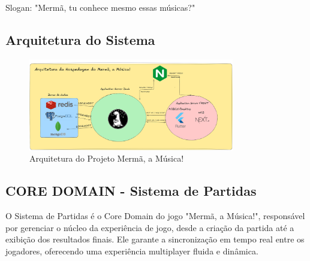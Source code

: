 \begin{titlepage}
Slogan: "Mermã, tu conhece mesmo essas músicas?"

\subsection{Arquitetura do Sistema}

\begin{figure}[H]
    \centering
    \includegraphics[width=0.8\textwidth]{image/arquitetura_do_projeto.png}
    \caption{Arquitetura do Projeto Mermã, a Música!}
    \label{fig:minha_imagem}
\end{figure}

\subsection{CORE DOMAIN - Sistema de Partidas}
    O Sistema de Partidas é o Core Domain do jogo "Mermã, a Música!", responsável por gerenciar o núcleo da experiência de jogo, desde a criação da partida até a exibição dos resultados finais.  Ele garante a sincronização em tempo real entre os jogadores, oferecendo uma experiência multiplayer fluida e dinâmica.
    
    

\end{titlepage}


